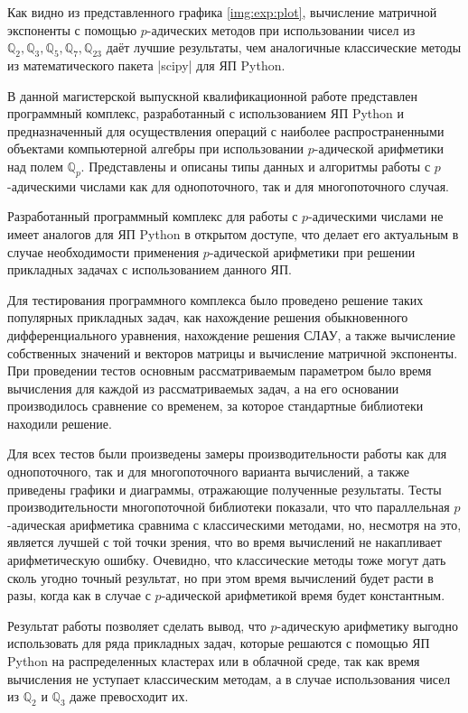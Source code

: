 \documentclass[master, och, diploma, times]{sty/SCWorks}
\theoremstyle{plain}
\theoremstyle{definition}
\numberwithin{equation}{section}
\begin{document}
Как видно из представленного графика \ref{img:exp:plot}, вычисление матричной экспоненты с помощью $p$-адических методов при использовании чисел из $\mathbb{Q}_2, \mathbb{Q}_3, \mathbb{Q}_5, \mathbb{Q}_7, \mathbb{Q}_{23}$ даёт лучшие результаты, чем аналогичные классические методы из математического пакета |scipy| для ЯП Python.


\conclusion

В данной магистерской выпускной квалификационной работе представлен программный комплекс, разработанный с использованием ЯП Python и предназначенный для осуществления операций с наиболее распространенными объектами компьютерной алгебры при использовании $p$-адической арифметики над полем $\mathbb{Q}_p$. Представлены и описаны типы данных и алгоритмы работы с $p$-адическими числами как для однопоточного, так и для многопоточного случая. 

Разработанный программный комплекс для работы с $p$-адическими числами не имеет аналогов для ЯП Python в открытом доступе, что делает его актуальным в случае необходимости применения $p$-адической арифметики при решении прикладных задачах с использованием данного ЯП.

Для тестирования программного комплекса было проведено решение таких популярных прикладных задач, как нахождение решения обыкновенного дифференциального уравнения, нахождение решения СЛАУ, а также вычисление собственных значений и векторов матрицы и вычисление матричной экспоненты. При проведении тестов  основным рассматриваемым параметром было время вычисления для каждой из рассматриваемых задач, а на его основании производилось сравнение со временем, за которое стандартные библиотеки находили решение.

Для всех тестов были произведены замеры производительности работы как для однопоточного, так и для многопоточного варианта вычислений, а также приведены графики и диаграммы, отражающие полученные результаты. Тесты производительности многопоточной библиотеки показали, что что параллельная $p$-адическая арифметика сравнима с классическими методами, но, несмотря на это, является лучшей с той точки зрения, что во время вычислений не накапливает арифметическую ошибку. Очевидно, что классические методы тоже могут дать сколь угодно точный результат, но при этом время вычислений будет расти в разы, когда как в случае с $p$-адической арифметикой время будет константным.

Результат работы позволяет сделать вывод, что $p$-адическую арифметику выгодно использовать для ряда прикладных задач, которые решаются с помощью ЯП Python на распределенных кластерах или в облачной среде, так как время вычисления не уступает классическим методам, а в случае использования чисел из $\mathbb{Q}_2$ и $\mathbb{Q}_3$ даже превосходит их.
\end{document}
